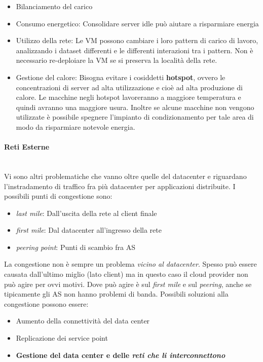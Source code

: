 \documentclass{article}
\providecommand{\tightlist}{%
		  \setlength{\itemsep}{0pt}\setlength{\parskip}{0pt}}
\begin{document}
		\begin{itemize}
		\tightlist
		\item
		  Bilanciamento del carico
		\item
		  Consumo energetico: Consolidare server idle può aiutare a risparmiare energia
		\item
		  Utilizzo della rete: Le VM possono cambiare i loro pattern di carico di lavoro, analizzando i dataset differenti e le differenti interazioni tra i pattern. Non è necessario re-deploiare la VM se si preserva la località della rete.
		\item
		  Gestione del calore: Bisogna evitare i cosiddetti \textbf{hotspot}, ovvero le concentrazioni di server ad alta utilizzazione e cioè ad alta produzione di calore. Le macchine negli hotspot lavoreranno a maggiore temperatura e quindi avranno una maggiore usura. Inoltre se alcune macchine non vengono utilizzate è possibile spegnere l'impianto di condizionamento per tale area di modo da risparmiare notevole energia.
		\end{itemize}
		
		\hypertarget{reti-esterne}{%
		\paragraph{Reti Esterne}\label{reti-esterne}}\mbox{}\\
		Vi sono altri problematiche che vanno oltre quelle del datacenter e 
		riguardano l’instradamento di traffico fra più datacenter per
		applicazioni distribuite.
		I possibili punti di congestione sono:
		\begin{itemize}
			\item \textit{last mile}: Dall'uscita della rete al client finale
			\item \textit{first mile}: Dal datacenter all'ingresso della rete
			\item \textit{peering point}: Punti di scambio fra AS
		\end{itemize}
		La congestione non è sempre un problema \emph{vicino al
		datacenter}. Spesso può essere causata dall'ultimo miglio (lato
		client) ma in questo caso il cloud provider non può agire per ovvi motivi. Dove può agire è sul \textit{first mile} e sul \textit{peering}, anche se tipicamente gli AS non hanno problemi di banda. Possibili
		soluzioni alla congestione possono essere:
		
		\begin{itemize}
		\tightlist
		\item
		  Aumento della connettività del data center
		\item
		  Replicazione dei service point
		\item
		  \textbf{Gestione del data center e delle \emph{reti che li
		  interconnettono}}
		\end{itemize}
		
\end{document}
